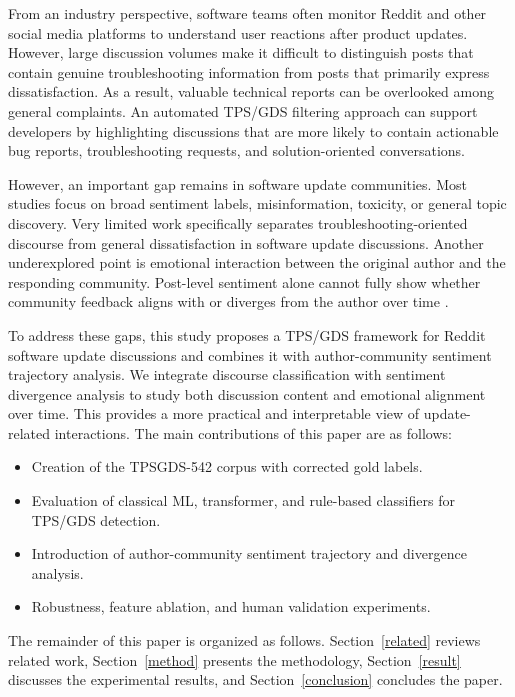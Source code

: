 \documentclass[conference]{IEEEtran}
\begin{document}
From an industry perspective, software teams often monitor Reddit and other social media platforms to understand user reactions after product updates. However, large discussion volumes make it difficult to distinguish posts that contain genuine troubleshooting information from posts that primarily express dissatisfaction. As a result, valuable technical reports can be overlooked among general complaints. An automated TPS/GDS filtering approach can support developers by highlighting discussions that are more likely to contain actionable bug reports, troubleshooting requests, and solution-oriented conversations.

However, an important gap remains in software update communities. Most studies focus on broad sentiment labels, misinformation, toxicity, or general topic discovery. Very limited work specifically separates troubleshooting-oriented discourse from general dissatisfaction in software update discussions. Another underexplored point is emotional interaction between the original author and the responding community. Post-level sentiment alone cannot fully show whether community feedback aligns with or diverges from the author over time \cite{liu2024}.

To address these gaps, this study proposes a TPS/GDS framework for Reddit software update discussions and combines it with author-community sentiment trajectory analysis. We integrate discourse classification with sentiment divergence analysis to study both discussion content and emotional alignment over time. This provides a more practical and interpretable view of update-related interactions. The main contributions of this paper are as follows:
\begin{itemize}
    \item Creation of the TPSGDS-542 corpus with corrected gold labels.
    \item Evaluation of classical ML, transformer, and rule-based classifiers for TPS/GDS detection.
    \item Introduction of author-community sentiment trajectory and divergence analysis.
    \item Robustness, feature ablation, and human validation experiments.
\end{itemize}
The remainder of this paper is organized as follows. Section~\ref{related} reviews related work, Section~\ref{method} presents the methodology, Section~\ref{result} discusses the experimental results, and Section~\ref{conclusion} concludes the paper.
\end{document}
